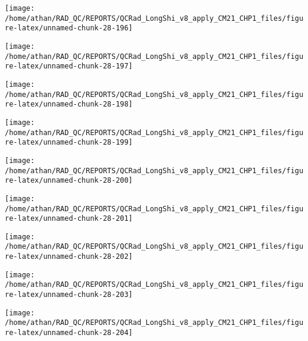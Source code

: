 \documentclass[
  10pt,
  a4paper,oneside]{article}
\begin{document}
\begin{center}\texttt{[image: /home/athan/RAD\_QC/REPORTS/QCRad\_LongShi\_v8\_apply\_CM21\_CHP1\_files/figure-latex/unnamed-chunk-28-196]} \end{center}

\begin{center}\texttt{[image: /home/athan/RAD\_QC/REPORTS/QCRad\_LongShi\_v8\_apply\_CM21\_CHP1\_files/figure-latex/unnamed-chunk-28-197]} \end{center}

\begin{center}\texttt{[image: /home/athan/RAD\_QC/REPORTS/QCRad\_LongShi\_v8\_apply\_CM21\_CHP1\_files/figure-latex/unnamed-chunk-28-198]} \end{center}

\begin{center}\texttt{[image: /home/athan/RAD\_QC/REPORTS/QCRad\_LongShi\_v8\_apply\_CM21\_CHP1\_files/figure-latex/unnamed-chunk-28-199]} \end{center}

\begin{center}\texttt{[image: /home/athan/RAD\_QC/REPORTS/QCRad\_LongShi\_v8\_apply\_CM21\_CHP1\_files/figure-latex/unnamed-chunk-28-200]} \end{center}

\begin{center}\texttt{[image: /home/athan/RAD\_QC/REPORTS/QCRad\_LongShi\_v8\_apply\_CM21\_CHP1\_files/figure-latex/unnamed-chunk-28-201]} \end{center}

\begin{center}\texttt{[image: /home/athan/RAD\_QC/REPORTS/QCRad\_LongShi\_v8\_apply\_CM21\_CHP1\_files/figure-latex/unnamed-chunk-28-202]} \end{center}

\begin{center}\texttt{[image: /home/athan/RAD\_QC/REPORTS/QCRad\_LongShi\_v8\_apply\_CM21\_CHP1\_files/figure-latex/unnamed-chunk-28-203]} \end{center}

\begin{center}\texttt{[image: /home/athan/RAD\_QC/REPORTS/QCRad\_LongShi\_v8\_apply\_CM21\_CHP1\_files/figure-latex/unnamed-chunk-28-204]} \end{center}
\end{document}
